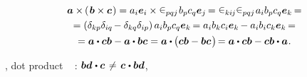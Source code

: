 \begin{otherlanguage}{russian}
\nopagebreak\vspace{-0.55em}\begin{multline}
\bm{a} \times \hspace{-0.15ex} \left(\hspace{.2ex}{\bm{b} \times \bm{c}}\hspace{.15ex}\right)
= a_i \bm{e}_i \times \levicivita_{pqj} \hspace{.2ex} b_p c_q \bm{e}_j \hspace{-0.2ex}
= \levicivita_{ki\hspace{-0.1ex}j} \levicivita_{pqj} \hspace{.2ex} a_i b_p c_q \bm{e}_k \hspace{-0.2ex} =
\\
= \left({\delta_{kp}\delta_{iq} \hspace{-0.2ex} - \delta_{kq}\delta_{ip}}\right) a_i b_p c_q \bm{e}_k \hspace{-0.2ex}
= a_i b_k c_i \bm{e}_k \hspace{-0.15ex} - a_i b_i c_k \bm{e}_k \hspace{-0.2ex} =
\\
= \bm{a} \dotp \bm{c} \bm{b} - \bm{a} \dotp \bm{b} \bm{c}
= \bm{a} \dotp \hspace{-0.1ex} \bigl( \bm{c} \bm{b} - \bm{b} \bm{c} \hspace{.15ex} \bigr) \hspace{-0.3ex}
= \bm{a} \dotp \bm{c} \bm{b} - \bm{c} \bm{b} \dotp \bm{a}
\hspace{.1ex} .
\end{multline}

\end{otherlanguage}

\vspace{-0.16em} \noindent {}, dot product  ~ :\ru{\hspace{.2ex}}
${\bm{b} \bm{d} \hspace{.1ex} \dotp \bm{c} \hspace{.25ex} \neq \hspace{.25ex} \bm{c} \hspace{.1ex} \dotp \bm{b} \bm{d}}$,
~ 

